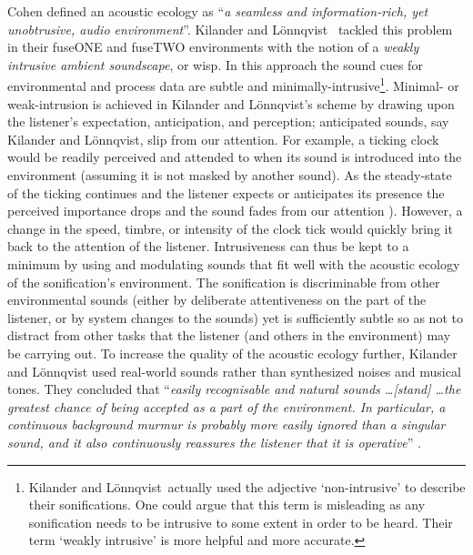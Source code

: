 \documentclass[runningheads]{llncs}
\newcommand{\killonq}{Kilander and L\"{o}nnqvist}
\begin{document}
Cohen \cite{Cohen:1994a} defined an acoustic ecology as ``\emph{a seamless and information-rich, yet unobtrusive, audio environment}''. \killonq\  \cite{Kilander:2002} tackled this problem in their {\sc fuseONE} and {\sc fuseTWO} environments with the notion of a \emph{weakly intrusive ambient soundscape}, or {\sc wisp}. In this approach the sound cues for environmental and process data are subtle and minimally-intrusive\footnote{\killonq\  actually used the adjective `non-intrusive' to describe their sonifications. One could argue that this term is misleading as any sonification needs to be intrusive to some extent in order to be heard. Their term `weakly intrusive' is more helpful and more accurate.}. Minimal- or weak-intrusion is achieved in \killonq's scheme by drawing upon the listener's expectation, anticipation, and perception; anticipated sounds, say \killonq, slip from our attention.  For example, a ticking clock would be readily perceived and attended to when its sound is introduced into the environment (assuming it is not masked by another sound). As the steady-state of the ticking continues and the listener expects or anticipates its presence the perceived importance drops and the sound fades from our attention \cite{Kilander:2002}). However, a change in the speed, timbre, or intensity of the clock tick would quickly bring it back to the attention of the listener. Intrusiveness can thus be kept to a minimum by using and modulating sounds that fit well with the acoustic ecology of the sonification's environment. The sonification is discriminable from other environmental sounds (either by deliberate attentiveness on the part of the listener, or by system changes to the sounds) yet is sufficiently subtle so as not to distract from other tasks that the listener (and others in the environment) may be carrying out. To increase the quality of the acoustic ecology further, {\killonq} used real-world sounds rather than synthesized noises and musical tones. They concluded that ``\emph{easily recognisable and natural sounds \ldots \emph{[stand]} \ldots the greatest chance of being accepted as a part of the environment. In particular, a continuous background murmur is probably more easily ignored than a singular sound, and it also continuously reassures the listener that it is operative}'' \cite{Kilander:2002}.
\end{document}
